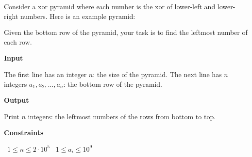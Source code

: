 Consider a xor pyramid where each number is the xor of lower-left and lower-right numbers. Here is an example pyramid:

Given the bottom row of the pyramid, your task is to find the leftmost number of each row.

\vspace{0.3cm}\noindent\textbf{Input}

The first line has an integer $n$: the size of the pyramid.
The next line has $n$ integers $a_1,a_2,\dots,a_n$: the bottom row of the pyramid.

\vspace{0.3cm}\noindent\textbf{Output}

Print $n$ integers: the leftmost numbers of the rows from bottom to top.

\vspace{0.3cm}\noindent\textbf{Constraints}

\textbullet\ $1 \le n \le 2 \cdot 10^5$
\textbullet\ $1 \le a_i \le 10^9$